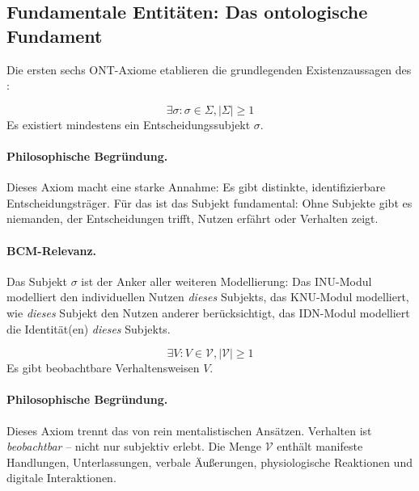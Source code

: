 \subsection{Fundamentale Entitäten: Das ontologische Fundament}

Die ersten sechs ONT-Axiome etablieren die grundlegenden Existenzaussagen des \BCM:

\begin{axiom}
\begin{equation}
\exists \sigma: \sigma \in \Sigma, |\Sigma| \geq 1
\end{equation}
Es existiert mindestens ein Entscheidungssubjekt $\sigma$.
\end{axiom}

\paragraph{Philosophische Begründung.}
Dieses Axiom macht eine starke Annahme: Es gibt distinkte, identifizierbare Entscheidungsträger. Für das \BCM{} ist das Subjekt fundamental: Ohne Subjekte gibt es niemanden, der Entscheidungen trifft, Nutzen erfährt oder Verhalten zeigt.

\paragraph{BCM-Relevanz.}
Das Subjekt $\sigma$ ist der Anker aller weiteren Modellierung: Das INU-Modul modelliert den individuellen Nutzen \textit{dieses} Subjekts, das KNU-Modul modelliert, wie \textit{dieses} Subjekt den Nutzen anderer berücksichtigt, das IDN-Modul modelliert die Identität(en) \textit{dieses} Subjekts.

\begin{axiom}
\begin{equation}
\exists V: V \in \mathcal{V}, |\mathcal{V}| \geq 1
\end{equation}
Es gibt beobachtbare Verhaltensweisen $V$.
\end{axiom}

\paragraph{Philosophische Begründung.}
Dieses Axiom trennt das \BCM{} von rein mentalistischen Ansätzen. Verhalten ist \textit{beobachtbar} -- nicht nur subjektiv erlebt. Die Menge $\mathcal{V}$ enthält manifeste Handlungen, Unterlassungen, verbale Äußerungen, physiologische Reaktionen und digitale Interaktionen.

